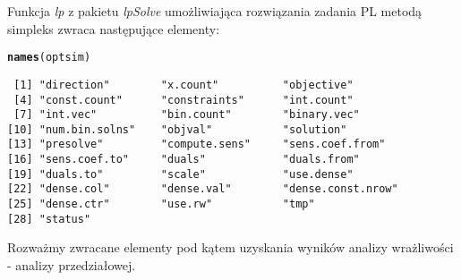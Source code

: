 \documentclass[11pt]{article}\usepackage{graphicx, color}
\makeatletter
\newcommand{\hlfunctioncall}[1]{\textcolor[rgb]{0.501960784313725,0,0.329411764705882}{\textbf{#1}}}%
\newenvironment{kframe}{%
 \def\at@end@of@kframe{}%
 \ifinner\ifhmode%
  \def\at@end@of@kframe{\end{minipage}}%
  \begin{minipage}{\columnwidth}%
 \fi\fi%
 \def\FrameCommand##1{\hskip\@totalleftmargin \hskip-\fboxsep
 \colorbox{shadecolor}{##1}\hskip-\fboxsep
     \hskip-\linewidth \hskip-\@totalleftmargin \hskip\columnwidth}%
 \MakeFramed {\advance\hsize-\width
   \@totalleftmargin\z@ \linewidth\hsize
   \@setminipage}}%
 {\par\unskip\endMakeFramed%
 \at@end@of@kframe}
\newenvironment{knitrout}{}{} %
\makeatother
\begin{document}
Funkcja \textit{lp} z pakietu \textit{lpSolve} umożliwiająca rozwiązania zadania PL metodą simpleks zwraca następujące elementy:
\begin{knitrout}
\color{fgcolor}\begin{kframe}
\begin{alltt}
\hlfunctioncall{names}(optsim)
\end{alltt}
\begin{verbatim}
 [1] "direction"        "x.count"          "objective"       
 [4] "const.count"      "constraints"      "int.count"       
 [7] "int.vec"          "bin.count"        "binary.vec"      
[10] "num.bin.solns"    "objval"           "solution"        
[13] "presolve"         "compute.sens"     "sens.coef.from"  
[16] "sens.coef.to"     "duals"            "duals.from"      
[19] "duals.to"         "scale"            "use.dense"       
[22] "dense.col"        "dense.val"        "dense.const.nrow"
[25] "dense.ctr"        "use.rw"           "tmp"             
[28] "status"          
\end{verbatim}
\end{kframe}
\end{knitrout}


Rozważmy zwracane elementy pod kątem uzyskania wyników analizy wrażliwości - analizy przedziałowej.
\end{document}
